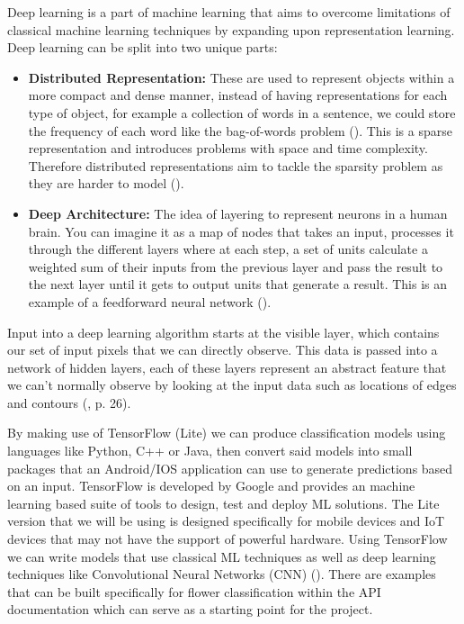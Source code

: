 \documentclass{article}
\begin{document}
\par

Deep learning is a part of machine learning that aims to overcome limitations of classical machine learning techniques 
by expanding upon representation learning. Deep learning can be split into two unique parts:

\begin{itemize}
    \item \textbf{Distributed Representation:} These are used to represent objects within a more compact and dense manner, 
instead of having representations for each type of object, for example a collection of words in a sentence, we could 
store the frequency of each word like the bag-of-words problem (\cite{liu2020representation}). This is a sparse
representation and introduces problems with space and time complexity. Therefore distributed representations aim to 
tackle the sparsity problem as they are harder to model (\cite{Brownlee2017}).
    \item \textbf{Deep Architecture:} The idea of layering to represent neurons in a human brain. You can imagine it as a map of 
nodes that takes an input, processes it through the different layers where at each step, a set of units calculate a 
weighted sum of their inputs from the previous layer and pass the result to the next layer until it gets to output units
that generate a result. This is an example of a feedforward neural network (\cite{lecun2015deep}).
\end{itemize}

\par

Input into a deep learning algorithm starts at the visible layer, which contains our set of input pixels that we can 
directly observe. This data is passed into a network of hidden layers, each of these layers represent an abstract 
feature that we can't normally observe by looking at the input data such as locations of edges and contours 
(\cite{goodfellow2016deep}, p. 26).

\par

By making use of TensorFlow (Lite) we can produce classification models using languages like Python, C++ or Java, then 
convert said models into small packages that an Android/IOS application can use to generate predictions based on an 
input. TensorFlow is developed by Google and provides an machine learning based suite of tools to design, test and 
deploy ML solutions. The Lite version that we will be using is designed specifically for mobile devices and IoT devices 
that may not have the support of powerful hardware. Using TensorFlow we can write models that use classical ML 
techniques as well as deep learning techniques like Convolutional Neural Networks (CNN) (\cite{googleTF2}). 
There are examples that can be built specifically for flower classification within the API documentation which can serve
as a starting point for the project.
\end{document}
